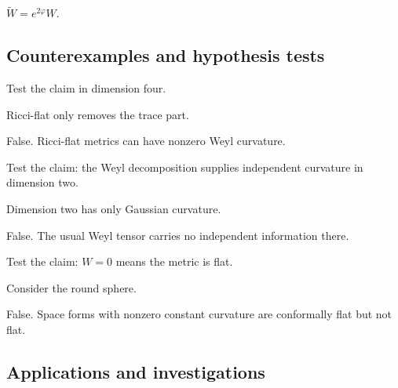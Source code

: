 \begin{solution}
\(\widetilde W=e^{2\varphi}W\).
\end{solution}

\subsection*{Counterexamples and hypothesis tests}

\begin{exercise}\label{exr:vii28-ped-10}
Test the claim in dimension four.
\end{exercise}

\begin{hint}
Ricci-flat only removes the trace part.
\end{hint}

\begin{solution}
False.  Ricci-flat metrics can have nonzero Weyl curvature.
\end{solution}

\begin{exercise}\label{exr:vii28-ped-11}
Test the claim: the Weyl decomposition supplies independent curvature in dimension two.
\end{exercise}

\begin{hint}
Dimension two has only Gaussian curvature.
\end{hint}

\begin{solution}
False.  The usual Weyl tensor carries no independent information there.
\end{solution}

\begin{exercise}\label{exr:vii28-ped-12}
Test the claim: \(W=0\) means the metric is flat.
\end{exercise}

\begin{hint}
Consider the round sphere.
\end{hint}

\begin{solution}
False.  Space forms with nonzero constant curvature are conformally flat but not flat.
\end{solution}

\subsection*{Applications and investigations}

